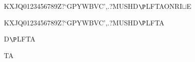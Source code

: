 \documentclass[12pt]{article}
\begin{document}
\begin{tt}
\begin{small}
\begin{bundle}{}
{\begin{bundle}{KXJQ0123456789Z?`GPYWBVC',.?MUSHD$\P$LFTAONRI$\sqcup$E}
{\begin{bundle}{KXJQ0123456789Z?`GPYWBVC',.?MUSHD$\P$LFTA}
{\begin{bundle}{D$\P$LFTA}
{\begin{bundle}{TA}
\end{bundle}}
\end{bundle}}
\end{bundle}}
\end{bundle}}
\end{bundle}
\end{small}
\end{tt}
\newpage%
\end{document}

